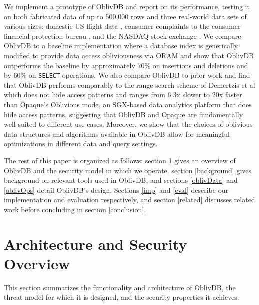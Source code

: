 \documentclass[USenglish,oneside,twocolumn]{article}
\def\name/{OblivDB}
\begin{document}
We implement a prototype of \name/ and report on its performance, testing it on both fabricated data of up to 500,000 rows and three real-world data sets of various sizes: domestic US flight data \cite{FLIGHT}, consumer complaints to the consumer financial protection bureau \cite{CFPB}, and the NASDAQ stock exchange \cite{NASDAQ}. We compare \name/ to a baseline implementation where a database index is generically modified to provide data access obliviousness via ORAM and show that \name/ outperforms the baseline by approximately 70\% on insertions and deletions and by 60\% on \texttt{SELECT} operations. We also compare \name/ to prior work and find that \name/ performs comparably to the range search scheme of Demertzis et al \cite{DPP+16} which does not hide access patterns and ranges from 6.3x slower to 20x faster than Opaque's Oblivious mode, an SGX-based data analytics platform that does hide access patterns, suggesting that \name/ and Opaque are fundamentally well-suited to different use cases. Moreover, we show that the choices of oblivious data structures and algorithms available in \name/ allow for meaningful optimizations in different data and query settings. 

The rest of this paper is organized as follows: section \ref{model} gives an overview of \name/ and the security model in which we operate. section \ref{background} gives background on relevant tools used in \name/, and sections \ref{oblivData} and \ref{oblivOps} detail \name/'s design. Sections \ref{imp} and \ref{eval} describe our implementation and evaluation respectively, and section \ref{related} discusses related work before concluding in section \ref{conclusion}. 

\section{Architecture and Security Overview}\label{model}
This section summarizes the functionality and architecture of \name/, the threat model for which it is designed, and the security properties it achieves. 
\end{document}
